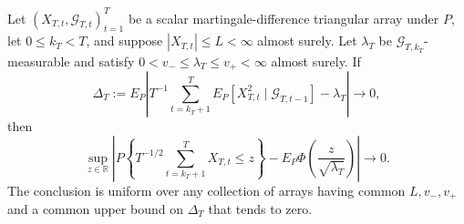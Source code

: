 Let \((X_{T,t},\mathcal G_{T,t})_{t=1}^T\) be a scalar martingale-difference triangular array under \(P\), let \(0\le k_T<T\), and suppose \(|X_{T,t}|\le L<\infty\) almost surely. Let \(\lambda_T\) be \(\mathcal G_{T,k_T}\)-measurable and satisfy \(0<v_-\le\lambda_T\le v_+<\infty\) almost surely. If
\[
 \Delta_T:=E_P\left|T^{-1}\sum_{t=k_T+1}^T
 E_P[X_{T,t}^2\mid\mathcal G_{T,t-1}]-\lambda_T\right|\longrightarrow0,
\]
then
\[
 \sup_{z\in\mathbb R}\left|P\left\{T^{-1/2}\sum_{t=k_T+1}^T X_{T,t}\le z\right\}
 -E_P\Phi\left(\frac{z}{\sqrt{\lambda_T}}\right)\right|\longrightarrow0.
\]
The conclusion is uniform over any collection of arrays having common \(L,v_-,v_+\) and a common upper bound on \(\Delta_T\) that tends to zero.
